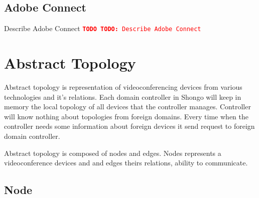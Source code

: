 \documentclass[a4paper]{report}
\newcommand{\TODO}[1]{%
\def\empty{}%
\def\prvniparametr{#1}%
\ifx\prvniparametr\empty%
\begingroup\tt\textcolor{red}{\noindent\textbf{TODO}}\endgroup
\else%
\begingroup\tt\textcolor{red}{\noindent\textbf{TODO:}\ #1}\endgroup
\fi%
}
\begin{document}
\section{Adobe Connect}

\TODO{Describe Adobe Connect}


\chapter{Abstract Topology}

Abstract topology is representation of videoconferencing devices from various technologies and it's relations. Each domain controller in Shongo will keep in memory the local topology of all devices that the controller manages.
Controller will know nothing about topologies from foreign domains. Every time when the controller needs some information about foreign devices it send request to foreign domain controller.

Abstract topology is composed of nodes and edges. Nodes represents a videoconference devices and and edges theirs relations, ability to communicate.

\section{Node}
\end{document}
